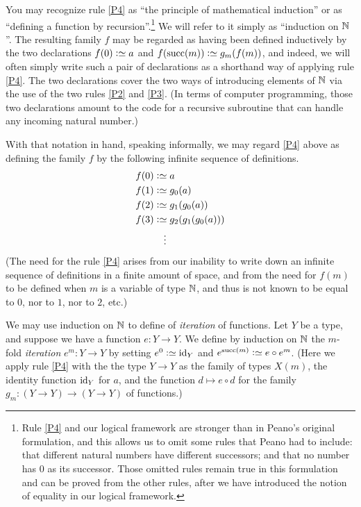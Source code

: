 You may recognize rule \ref{P4} as ``the principle of mathematical induction'' or as ``defining a function by recursion''.\footnote{%
  Rule \ref{P4} and our logical framework are stronger than in Peano's original formulation, and this allows us to omit some rules that Peano had to include:
  that different natural numbers have different successors; and that no number has $0$ as its successor.  Those omitted rules
  remain true in this formulation and can be proved from the other rules, after we have introduced the notion of equality in
  our logical framework.}
We will refer to it simply as ``induction on $\mathbb{N}$''.  
The resulting family $f$ may be regarded as having been defined inductively
by the two declarations $f(0) \defeq a$ and $f(\Succ(m)) \defeq g_m(f(m))$,
and indeed, we will often simply write such a pair of declarations as a shorthand way of applying rule \ref{P4}.
The two declarations cover the two ways of introducing elements of $\mathbb{N}$ via the use of the two rules \ref{P2} and \ref{P3}.
(In terms of computer programming, those two declarations amount to the code for a recursive subroutine that can handle any incoming natural number.)

With that notation in hand, speaking informally, we may regard \ref{P4} above as defining the family $f$ by the following infinite sequence of definitions.
\begin{align*}
  f(0) & \defeq a \\
  f(1) & \defeq g_0(a) \\
  f(2) & \defeq g_1(g_0(a)) \\
  f(3) & \defeq g_2(g_1(g_0(a))) \\
  & \quad \vdots
\end{align*}
(The need for the rule \ref{P4} arises from our inability to write down an infinite sequence of definitions in a finite amount of space, and
from the need for $f(m)$ to be defined when $m$ is a variable of type $\mathbb{N}$, and thus is not known to be equal to $0$, nor to $1$, nor to $2$,
etc.)

We may use induction on $\mathbb{N}$ to define of \emph{iteration} of functions.  Let $Y$ be a type, and suppose we have a function $e : Y \to Y$.  We
define by induction on $\mathbb{N}$ the $m$-fold \emph{iteration} $e^m : Y \to Y$ by setting $e^0 \defeq \id_Y$ and $e^{\Succ(m)}\defeq e\circ e^m$.
(Here we apply rule \ref{P4} with the the type $Y \to Y$ as the family of types $X(m)$, the identity function $\mathord{\mathrm{id}}_Y$ for $a$, and the function
$d \mapsto e\circ d$ for the family $g_m : (Y\to Y)\to(Y\to Y)$ of functions.)

